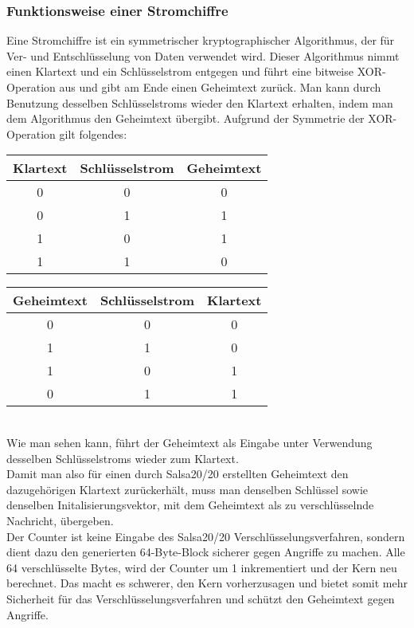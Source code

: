 \documentclass[course=erap]{aspdoc}
\begin{document}
\subsubsection{Funktionsweise einer Stromchiffre} \label{streamcipher}
Eine Stromchiffre ist ein symmetrischer kryptographischer Algorithmus, der für Ver- und Entschlüsselung von Daten verwendet wird.
Dieser Algorithmus nimmt einen Klartext und ein Schlüsselstrom entgegen und führt eine bitweise XOR-Operation aus und gibt am Ende
einen Geheimtext zurück.
Man kann durch Benutzung desselben Schlüsselstroms wieder den Klartext erhalten, indem man dem Algorithmus den Geheimtext übergibt.
Aufgrund der Symmetrie der XOR-Operation gilt folgendes:
\begin{table}[!h]
    \begin{tabular}{|c|c|c|}
        \hline
        Klartext & Schlüsselstrom & Geheimtext \\
        \hline
        0        & 0              & 0          \\
        0        & 1              & 1          \\
        1        & 0              & 1          \\
        1        & 1              & 0          \\
        \hline
    \end{tabular}
    \begin{tabular}{|c|c|c|}
        \hline
        Geheimtext & Schlüsselstrom & Klartext \\
        \hline
        0          & 0              & 0        \\
        1          & 1              & 0        \\
        1          & 0              & 1        \\
        0          & 1              & 1        \\
        \hline
    \end{tabular}
\end{table}
\\
Wie man sehen kann, führt der Geheimtext als Eingabe unter Verwendung desselben Schlüsselstroms wieder zum Klartext.
\vspace{3mm}
\\
Damit man also für einen durch Salsa20/20 erstellten Geheimtext den dazugehörigen Klartext zurückerhält,
muss man denselben Schlüssel sowie denselben Initalisierungsvektor, mit dem Geheimtext als zu verschlüsselnde Nachricht, übergeben.
\\
Der Counter ist keine Eingabe des Salsa20/20 Verschlüsselungsverfahren, sondern dient dazu den generierten 64-Byte-Block sicherer gegen Angriffe zu machen. 
Alle 64 verschlüsselte Bytes, wird der Counter um 1 inkrementiert und der Kern neu berechnet. Das macht es schwerer, den Kern vorherzusagen und bietet somit mehr Sicherheit für das Verschlüsselungsverfahren und schützt den Geheimtext gegen Angriffe.
\end{document}
